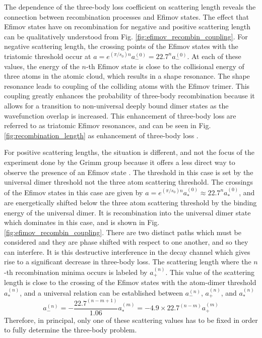 \documentclass[prl,onecolumn,amsmath,amssymb,titlepage,nofootinbib,preprint]{revtex4-1}
\begin{document}
The dependence of the three-body loss coefficient on scattering length reveals the connection between recombination processes and Efimov states.  The effect that Efimov states have on recombination for negative and positive scattering length can be qualitatively understood from Fig. \ref{fig:efimov_recombin_coupling}.  For negative scattering length, the crossing points of the Efimov states with the triatomic threshold occur at $a=e^{(\pi/s_{0})n}a_{-}^{(0)}=22.7^{n}a_{-}^{(0)}$.  At each of these values, the energy of the $n$-th Efimov state is close to the collisional energy of three atoms in the atomic cloud, which results in a shape resonance.  The shape resonance leads to coupling of the colliding atoms with the Efimov trimer.  This coupling greatly enhances the probability of three-body recombination because it allows for a transition to non-universal deeply bound dimer states as the wavefunction overlap is increased. This enhancement of three-body loss are referred to as triatomic Efimov resonances, and can be seen in Fig. \ref{fig:recombination_length} as enhancement of three-body loss \cite{Ferlaino2011}\cite{Efimov1979}.


For positive scattering lengths, the situation is different, and not the focus of the experiment done by the Grimm group because it offers a less direct way to observe the presence of an Efimov state \cite{Huang2014}.  The threshold in this case is set by the universal dimer threshold not the three atom scattering threshold.  The crossings of the Efimov states in this case are given by $a=e^{(\pi/s_{0})n}a_{*}^{(0)}\approx22.7^{n} a_{*}^{(0)}$, and are energetically shifted below the three atom scattering threshold by the binding energy of the universal dimer.  It is recombination into the universal dimer state which dominates in this case, and is shown in Fig. \ref{fig:efimov_recombin_coupling}.  There are two distinct paths which must be considered and they are phase shifted with respect to one another, and so they can interfere.  It is this destructive interference in the decay channel which gives rise to a significant  decrease in three-body loss.  The scattering length where the $n$-th recombination minima occurs is labeled by $a_{+}^{(n)}$.  This value of the scattering length is close to the crossing of the Efimov states with the atom-dimer threshold $a_{*}^{(n)}$, and a universal relation can be established between $a_{-}^{(n)}$, $a_{+}^{(n)}$, and $a_{*}^{(n)}$\cite{Braaten_2006}\cite{Ferlaino2011} 
	\begin{equation}\label{eq:univ_crossing_relations}
		a_{-}^{(n)}=-\frac{22.7^{(n-m+1)}}{1.06}a_{*}^{(m)}=-4.9\times 22.7^{(n-m)}a_{+}^{(m)}
	\end{equation}
Therefore, in principal, only one of these scattering values has to be fixed in order to fully determine the three-body problem.
\end{document}
